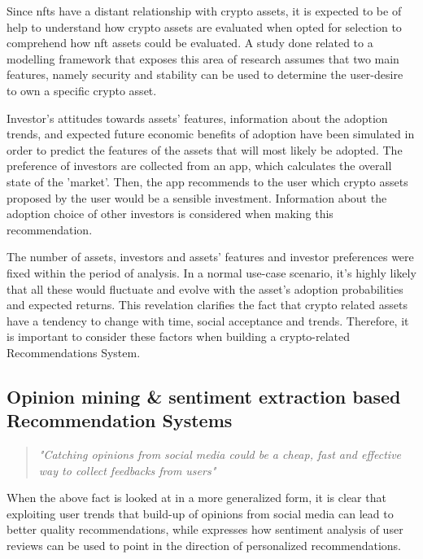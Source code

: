 Since \gls{nft}s have a distant relationship with crypto assets, it is expected to be of help to understand how crypto assets are evaluated when opted for selection to comprehend how \gls{nft} assets could be evaluated. A study done related to a modelling framework that exposes this area of research \autocite{bartolucci_model_2020} assumes that two main features, namely security and stability can be used to determine the user-desire to own a specific crypto asset. 

Investor's attitudes towards assets’ features, information about the adoption trends, and expected future economic benefits of adoption have been simulated in order to predict the features of the assets that will most likely be adopted. The preference of investors are collected from an app, which calculates the overall state of the 'market'. Then, the app recommends to the user which crypto assets proposed by the user would be a sensible investment. Information about the adoption choice of other investors is considered when making this recommendation.

The number of assets, investors and assets' features and investor preferences were fixed within the period of analysis. In a normal use-case scenario, it's highly likely that all these would fluctuate and evolve with the asset's adoption probabilities and expected returns. This revelation clarifies the fact that crypto related assets have a tendency to change with time, social acceptance and trends. Therefore, it is important to consider these factors when building a crypto-related Recommendations System.


\subsection{Opinion mining \& sentiment extraction based Recommendation Systems}

\begin{quote} 
\centering 
\emph{"Catching opinions from social media could be a cheap, fast and effective way to collect feedbacks from users"} 
\\
\raggedleft
\autocite{nah_opinion_2018}
\end{quote}

When the above fact is looked at in a more generalized form, it is clear that exploiting user trends that build-up of opinions from social media can lead to better quality recommendations, while \autocite{hu_reviewer_2020} expresses how sentiment analysis of user reviews can be used to point in the direction of personalized recommendations.

